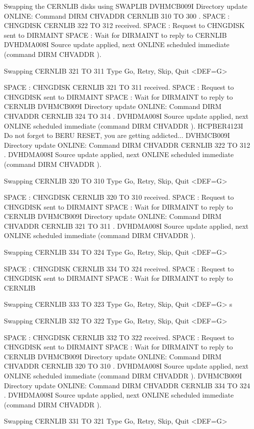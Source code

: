 \begin{XMPt}{Swapping the CERNLIB disks using SWAPLIB}
 DVHMCB009I Directory update ONLINE: Command DIRM CHVADDR CERNLIB 310 TO 300 .
 SPACE : CHNGDISK CERNLIB 322 TO 312 received.
 SPACE : Request to CHNGDISK sent to DIRMAINT
 SPACE : Wait for DIRMAINT to reply to CERNLIB
 DVHDMA008I Source update applied, next ONLINE scheduled immediate (command
    DIRM CHVADDR ).
 
 Swapping CERNLIB 321 TO 311
 Type Go, Retry, Skip, Quit <DEF=G>
 
 SPACE : CHNGDISK CERNLIB 321 TO 311 received.
 SPACE : Request to CHNGDISK sent to DIRMAINT
 SPACE : Wait for DIRMAINT to reply to CERNLIB
 DVHMCB009I Directory update ONLINE: Command DIRM CHVADDR CERNLIB 324 TO 314 .
 DVHDMA008I Source update applied, next ONLINE scheduled immediate (command
    DIRM CHVADDR ).
 HCPBER4123I Do not forget to BERU RESET, you are getting addicted...
 DVHMCB009I Directory update ONLINE: Command DIRM CHVADDR CERNLIB 322 TO 312 .
 DVHDMA008I Source update applied, next ONLINE scheduled immediate (command
    DIRM CHVADDR ).
 
 Swapping CERNLIB 320 TO 310
 Type Go, Retry, Skip, Quit <DEF=G>
 
 SPACE : CHNGDISK CERNLIB 320 TO 310 received.
 SPACE : Request to CHNGDISK sent to DIRMAINT
 SPACE : Wait for DIRMAINT to reply to CERNLIB
 DVHMCB009I Directory update ONLINE: Command DIRM CHVADDR CERNLIB 321 TO 311 .
 DVHDMA008I Source update applied, next ONLINE scheduled immediate (command
    DIRM CHVADDR ).
 
 Swapping CERNLIB 334 TO 324
 Type Go, Retry, Skip, Quit <DEF=G>
 
 SPACE : CHNGDISK CERNLIB 334 TO 324 received.
 SPACE : Request to CHNGDISK sent to DIRMAINT
 SPACE : Wait for DIRMAINT to reply to CERNLIB
 
 Swapping CERNLIB 333 TO 323
 Type Go, Retry, Skip, Quit <DEF=G>
 s
 
 Swapping CERNLIB 332 TO 322
 Type Go, Retry, Skip, Quit <DEF=G>
 
 SPACE : CHNGDISK CERNLIB 332 TO 322 received.
 SPACE : Request to CHNGDISK sent to DIRMAINT
 SPACE : Wait for DIRMAINT to reply to CERNLIB
 DVHMCB009I Directory update ONLINE: Command DIRM CHVADDR CERNLIB 320 TO 310 .
 DVHDMA008I Source update applied, next ONLINE scheduled immediate (command
    DIRM CHVADDR ).
 DVHMCB009I Directory update ONLINE: Command DIRM CHVADDR CERNLIB 334 TO 324 .
 DVHDMA008I Source update applied, next ONLINE scheduled immediate (command
    DIRM CHVADDR ).
 
 Swapping CERNLIB 331 TO 321
 Type Go, Retry, Skip, Quit <DEF=G>
 

\end{XMPt}
